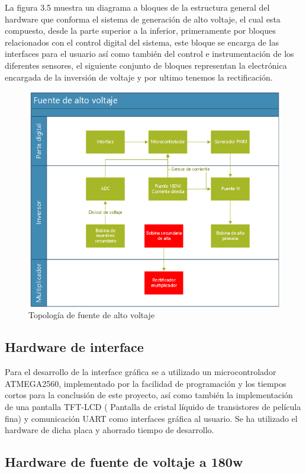 La figura 3.5 muestra un diagrama a bloques de la estructura general del hardware que conforma el sistema de generación de alto voltaje, el cual esta compuesto, desde la parte superior a la inferior, primeramente por bloques relacionados con el control digital del sistema, este bloque se encarga de las interfaces para el usuario así como también del control e instrumentación de los diferentes sensores, el siguiente conjunto de bloques representan la electrónica encargada de la inversión de voltaje y por ultimo tenemos la rectificación.  \\

\begin{figure}[H]
\centering
\includegraphics[width=12cm]{Capitulo3/figs/diagrama.png}
\caption{Topología de fuente de alto voltaje}
\end{figure}
\newpage
\subsection{Hardware de interface}
Para el desarrollo de la interface gráfica se a utilizado un microcontrolador ATMEGA2560, implementado por la facilidad de programación y los tiempos cortos para la conclusión de este proyecto, así como también la implementación de una pantalla TFT-LCD ( Pantalla de cristal líquido de transistores de película fina) y comunicación UART como interfaces gráfica al usuario. Se ha utilizado el hardware de dicha placa y ahorrado tiempo de desarrollo. \\




\newpage
\subsection{Hardware de fuente de voltaje a 180w}



